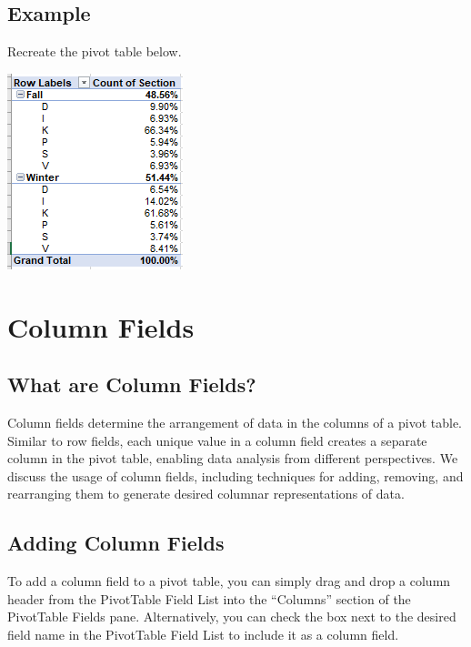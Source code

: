 \documentclass[
]{book}
\begin{document}
\hypertarget{example}{%
\subsection{Example}\label{example}}

Recreate the pivot table below.

\includegraphics{PT4.png}

\hypertarget{column-fields}{%
\section{Column Fields}\label{column-fields}}

\hypertarget{what-are-column-fields}{%
\subsection{What are Column Fields?}\label{what-are-column-fields}}

Column fields determine the arrangement of data in the columns of a pivot table. Similar to row fields, each unique value in a column field creates a separate column in the pivot table, enabling data analysis from different perspectives. We discuss the usage of column fields, including techniques for adding, removing, and rearranging them to generate desired columnar representations of data.

\hypertarget{adding-column-fields}{%
\subsection{Adding Column Fields}\label{adding-column-fields}}

To add a column field to a pivot table, you can simply drag and drop a column header from the PivotTable Field List into the ``Columns'' section of the PivotTable Fields pane. Alternatively, you can check the box next to the desired field name in the PivotTable Field List to include it as a column field.
\end{document}
